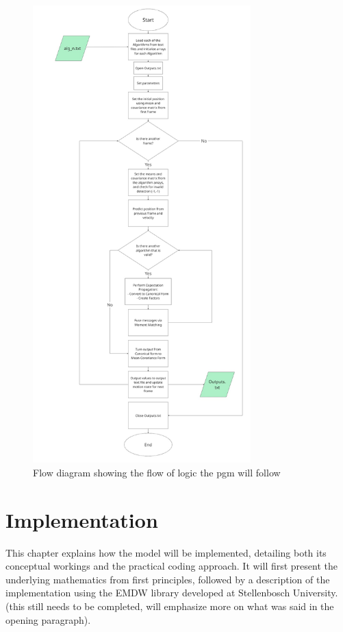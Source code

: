 \documentclass[12pt,a4paper]{article}
\begin{document}
\begin{figure}[H]
	\centering
	\includegraphics[width=0.75\textwidth]{pgmflowdesign.jpg}
	\caption{Flow diagram showing the flow of logic the \acs{pgm} will follow}
	\label{fig:pgmflow}
\end{figure}

 \newpage
\section{Implementation}
This chapter explains how the model will be implemented, detailing both its conceptual workings and the practical coding approach. It will first present the underlying mathematics from first principles, followed by a description of the implementation using the EMDW library developed at Stellenbosch University. (this still needs to be completed, will emphasize more on what was said in the opening paragraph).
\end{document}
